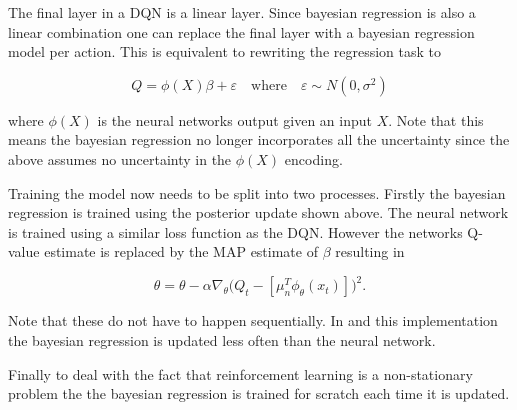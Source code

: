 The final layer in a DQN is a linear layer. Since bayesian regression is also a linear combination one can replace the final layer with a bayesian regression model per action. This is equivalent to rewriting the regression task to 

\begin{equation*}
	Q = \phi(X)\beta + \varepsilon \quad \text{where} \quad \varepsilon \sim N(0,\sigma^2)
\end{equation*}

where $\phi(X)$ is the neural networks output given an input $X$. Note that this means the bayesian regression no longer incorporates all the uncertainty since the above assumes no uncertainty in the $\phi(X)$ encoding. 

Training the model now needs to be split into two processes. Firstly the bayesian regression is trained using the posterior update shown above. The neural network is trained using a similar loss function as the DQN. However the networks Q-value estimate is replaced by the MAP estimate of $\beta$ resulting in

\begin{equation*}
	\theta = \theta - \alpha\nabla_\theta\big(Q_t - [\mu_n^T\phi_\theta(x_t)]\big)^2.
\end{equation*}

Note that these do not have to happen sequentially. In \cite{azziz_2018} and this implementation the bayesian regression is updated less often than the neural network.

Finally to deal with the fact that reinforcement learning is a non-stationary problem the the bayesian regression is trained for scratch each time it is updated.

\cleardoublepage